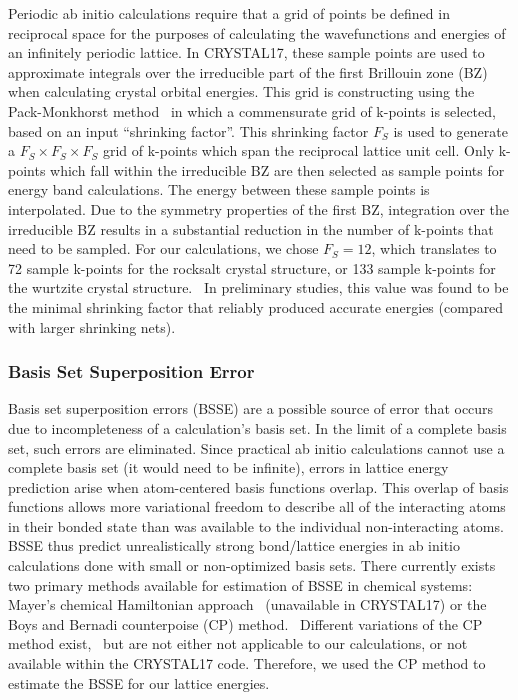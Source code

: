 \documentclass[titlepage,11pt]{article}
\begin{document}
Periodic ab initio calculations require that a grid of points be defined in reciprocal space for the purposes of calculating the wavefunctions and energies of an infinitely periodic lattice. In CRYSTAL17, these sample points are used to approximate integrals over the irreducible part of the first Brillouin zone (BZ) when calculating crystal orbital energies. This grid is constructing using the Pack-Monkhorst method~\cite{monkhorst1976} in which a commensurate grid of k-points is selected, based on an input ``shrinking factor''. This shrinking factor $F_{S}$ is used to generate a $F_{S} \times F_{S} \times F_{S}$ grid of k-points which span the reciprocal lattice unit cell. Only k-points which fall within the irreducible BZ are then selected as sample points for energy band calculations. The energy between these sample points is interpolated. Due to the symmetry properties of the first BZ, integration over the irreducible BZ results in a substantial reduction in the number of k-points that need to be sampled. For our calculations, we chose $F_{S} = 12$, which translates to 72 sample k-points for the rocksalt crystal structure, or 133 sample k-points for the wurtzite crystal structure.~\cite{Crystal17Manual} In preliminary studies, this value was found to be the minimal shrinking factor that reliably produced accurate energies (compared with larger shrinking nets).

\subsubsection{Basis Set Superposition Error}

Basis set superposition errors (BSSE) are a possible source of error that occurs due to incompleteness of a calculation's basis set. In the limit of a complete basis set, such errors are eliminated. Since practical ab initio calculations cannot use a complete basis set (it would need to be infinite), errors in lattice energy prediction arise when atom-centered basis functions overlap. This overlap of basis functions allows more variational freedom to describe all of the interacting atoms in their bonded state than was available to the individual non-interacting atoms. BSSE thus predict unrealistically strong bond/lattice energies in ab initio calculations done with small or non-optimized basis sets. There currently exists two primary methods available for estimation of BSSE in chemical systems: Mayer's chemical Hamiltonian approach~\cite{mayer1983towards} (unavailable in CRYSTAL17) or the Boys and Bernadi counterpoise (CP) method.~\cite{boys1970calculation} Different variations of the CP method exist,~\cite{kruse2012geometrical} but are not either not applicable to our calculations, or not available within the CRYSTAL17 code. Therefore, we used the CP method to estimate the BSSE for our lattice energies. 
\end{document}
